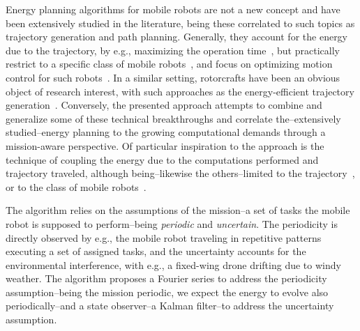 \documentclass[letterpaper,10pt,conference]{ieeeconf}
\begin{document}
Energy planning algorithms for mobile robots are not a new concept and have been extensively studied in the literature, being these correlated to such topics as trajectory generation and path planning. Generally, they account for the energy due to the trajectory, by e.g., maximizing the operation time~\cite{wahab2015energy}, but practically restrict to a specific class of mobile robots~\cite{kim2005energy}, and focus on optimizing motion control for such robots~\cite{kim2008minimum}. In a similar setting, rotorcrafts have been an obvious object of research interest, with such approaches as the energy-efficient trajectory generation~\cite{morbidi2016minimum,kreciglowa2017energy}. Conversely, the presented approach attempts to combine and generalize some of these technical breakthroughs and correlate the--extensively studied--energy planning to the growing computational demands through a mission-aware perspective.
Of particular inspiration to the approach is the technique of coupling the energy due to the computations performed and trajectory traveled, although being--likewise the others--limited to the trajectory~\cite{mei2004energy,mei2005case,mei2006deployment}, or to the class of mobile robots~\cite{sadrpour2013mission,sadrpour2013experimental}. 

The algorithm relies on the assumptions of the mission--a set of tasks the mobile robot is supposed to perform--being \emph{periodic} and \emph{uncertain}. The periodicity is directly observed by e.g., the mobile robot traveling in repetitive patterns executing a set of assigned tasks, and the uncertainty accounts for the environmental interference, with e.g., a fixed-wing drone drifting due to windy weather. The algorithm proposes a Fourier series to address the periodicity assumption--being the mission periodic, we expect the energy to evolve also periodically--and a state observer--a Kalman filter--to address the uncertainty assumption.



\end{document}
